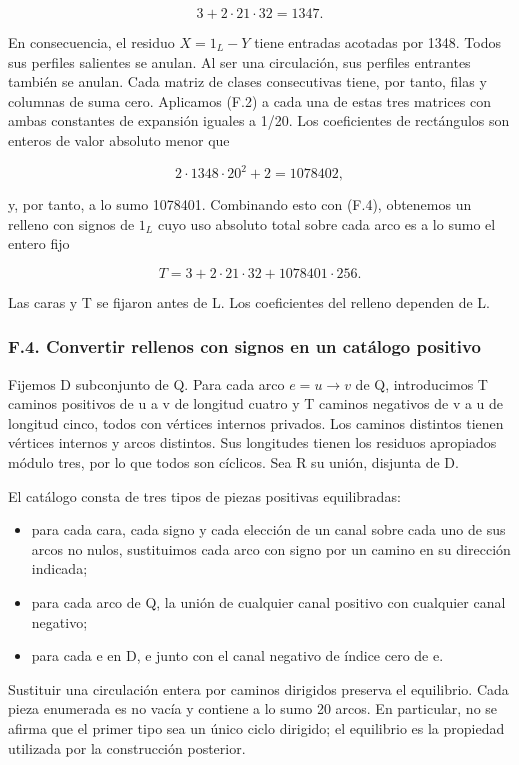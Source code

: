 \documentclass[spanish,11pt,a4paper]{article}
\providecommand{\tightlist}{\setlength{\itemsep}{0pt}\setlength{\parskip}{0pt}}
\begin{document}
\[3+2\cdot21\cdot32=1347.\]

En consecuencia, el residuo \(X=1_{L}-Y\) tiene entradas acotadas por 1348. Todos sus perfiles salientes se anulan. Al ser una circulación, sus perfiles entrantes también se anulan. Cada matriz de clases consecutivas tiene, por tanto, filas y columnas de suma cero. Aplicamos (F.2) a cada una de estas tres matrices con ambas constantes de expansión iguales a 1/20. Los coeficientes de rectángulos son enteros de valor absoluto menor que

\[2\cdot1348\cdot20^2+2=1078402,\]

y, por tanto, a lo sumo 1078401. Combinando esto con (F.4), obtenemos un relleno con signos de \(1_{L}\) cuyo uso absoluto total sobre cada arco es a lo sumo el entero fijo

\[T=3+2\cdot21\cdot32+1078401\cdot256.\tag{F.5}\]

Las caras y T se fijaron antes de L. Los coeficientes del relleno dependen de L.

\subsubsection{F.4. Convertir rellenos con signos en un catálogo positivo}\label{f.4.-convertir-rellenos-con-signos-en-un-catuxe1logo-positivo}

Fijemos D subconjunto de Q. Para cada arco \(e=u\to v\) de Q, introducimos T caminos positivos de u a v de longitud cuatro y T caminos negativos de v a u de longitud cinco, todos con vértices internos privados. Los caminos distintos tienen vértices internos y arcos distintos. Sus longitudes tienen los residuos apropiados módulo tres, por lo que todos son cíclicos. Sea R su unión, disjunta de D.

El catálogo consta de tres tipos de piezas positivas equilibradas:

\begin{itemize}
\tightlist
\item
  para cada cara, cada signo y cada elección de un canal sobre cada uno de sus arcos no nulos, sustituimos cada arco con signo por un camino en su dirección indicada;
\item
  para cada arco de Q, la unión de cualquier canal positivo con cualquier canal negativo;
\item
  para cada e en D, e junto con el canal negativo de índice cero de e.
\end{itemize}

Sustituir una circulación entera por caminos dirigidos preserva el equilibrio. Cada pieza enumerada es no vacía y contiene a lo sumo 20 arcos. En particular, no se afirma que el primer tipo sea un único ciclo dirigido; el equilibrio es la propiedad utilizada por la construcción posterior.
\end{document}
